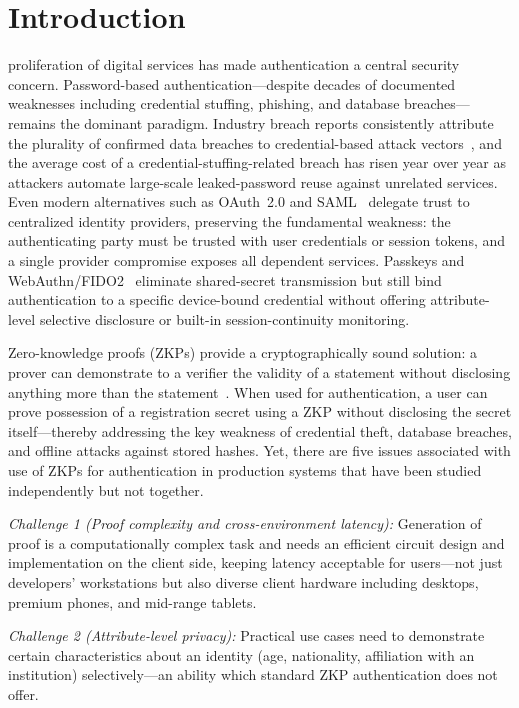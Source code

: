 \documentclass[journal,twoside,10pt]{IEEEtran}
\begin{document}
\section{Introduction}
 proliferation of digital services has made authentication
a central security concern. Password-based authentication---despite decades of
documented weaknesses including credential stuffing, phishing, and database
breaches---remains the dominant paradigm. Industry breach reports consistently
attribute the plurality of confirmed data breaches to credential-based attack
vectors~\cite{dbir}, and the average cost of a credential-stuffing-related breach has
risen year over year as attackers automate large-scale leaked-password reuse
against unrelated services. Even modern alternatives such as OAuth~2.0 and
SAML~\cite{saml} delegate trust to centralized identity providers, preserving the
fundamental weakness: the authenticating party must be trusted with user
credentials or session tokens, and a single provider compromise exposes all
dependent services. Passkeys and WebAuthn/FIDO2~\cite{fido2} eliminate
shared-secret transmission but still bind authentication to a specific
device-bound credential without offering attribute-level selective
disclosure or built-in session-continuity monitoring.

Zero-knowledge proofs (ZKPs) provide a cryptographically sound solution:
a prover can demonstrate to a verifier the validity of a statement without
disclosing anything more than the statement~\cite{gmr89}. When used for
authentication, a user can prove possession of a registration secret using
a ZKP without disclosing the secret itself---thereby addressing the key
weakness of credential theft, database breaches, and offline attacks
against stored hashes. Yet, there are five issues associated with use of
ZKPs for authentication in production systems that have been studied
independently but not together.

\textit{Challenge 1 (Proof complexity and cross-environment latency):} Generation of proof
is a computationally complex task and needs an efficient circuit design
and implementation on the client side, keeping latency acceptable for
users---not just developers' workstations but also diverse client
hardware including desktops, premium phones, and mid-range tablets.

\textit{Challenge 2 (Attribute-level privacy):} Practical use cases need to
demonstrate certain characteristics about an identity (age, nationality,
affiliation with an institution) selectively---an ability which standard
ZKP authentication does not offer.
\end{document}
